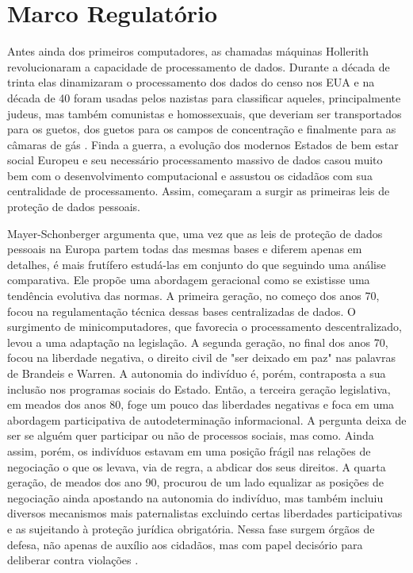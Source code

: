 \section{Marco Regulatório}
\label{sec:marco-regulatorio}

Antes ainda dos primeiros computadores, as chamadas máquinas Hollerith revolucionaram a capacidade de processamento de dados.
Durante a década de trinta elas dinamizaram o processamento dos dados do censo nos EUA e na década de 40 foram usadas pelos nazistas para classificar aqueles, principalmente judeus, mas também comunistas e homossexuais, que deveriam ser transportados para os guetos, dos guetos para os campos de concentração e finalmente para as câmaras de gás \cite{Black01}.
Finda a guerra, a evolução dos modernos Estados de bem estar social Europeu e seu necessário processamento massivo de dados casou muito bem com o desenvolvimento computacional e assustou os cidadãos com sua centralidade de processamento.
Assim, começaram a surgir as primeiras leis de proteção de dados pessoais.

Mayer-Schonberger argumenta que, uma vez que as leis de proteção de dados pessoais na Europa partem todas das mesmas bases e diferem apenas em detalhes, é mais frutífero estudá-las em conjunto do que seguindo uma análise comparativa.
Ele propõe uma abordagem geracional como se existisse uma tendência evolutiva das normas.
A primeira geração, no começo dos anos 70, focou na regulamentação técnica dessas bases centralizadas de dados.
O surgimento de minicomputadores, que favorecia o processamento descentralizado, levou a uma adaptação na legislação.
A segunda geração, no final dos anos 70, focou na liberdade negativa, o direito civil de "ser deixado em paz" nas palavras de Brandeis e Warren.
A autonomia do indivíduo é, porém, contraposta a sua inclusão nos programas sociais do Estado.
Então, a terceira geração legislativa, em meados dos anos 80, foge um pouco das liberdades negativas e foca em uma abordagem participativa de autodeterminação informacional.
A pergunta deixa de ser se alguém quer participar ou não de processos sociais, mas como.
Ainda assim, porém, os indivíduos estavam em uma posição frágil nas relações de negociação o que os levava, via de regra, a abdicar dos seus direitos.
A quarta geração, de meados dos ano 90, procurou de um lado equalizar as posições de negociação ainda apostando na autonomia do indivíduo, mas também incluiu diversos mecanismos mais paternalistas excluindo certas liberdades participativas e as sujeitando à proteção jurídica obrigatória.
Nessa fase surgem órgãos de defesa, não apenas de auxílio aos cidadãos, mas com papel decisório para deliberar contra violações \cite{Mayer-Schonberger97}.

